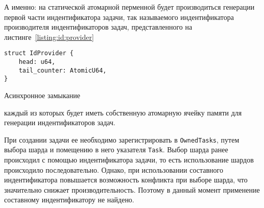 А именно: на статической атомарной перменной будет производиться генерации первой части индентификатора задачи, так называемого индентификатора производителя индентификаторов задач, представленного на листинге~\ref{listing:id:provider}

\begin{listing}[H]
    \begin{verbatim}
struct IdProvider {
    head: u64,
    tail_counter: AtomicU64,
}
    \end{verbatim}

    \caption{Асинхронное замыкание}
    \label{listing:id:provider}
\end{listing}

каждый из которых будет иметь собственную атомарную ячейку памяти для генерации индентификаторов задач.

При создании задачи ее необходимо зарегистрировать в \verb|OwnedTasks|, путем выбора шарда и помещению в него указателя \verb|Task|. Выбор шарда ранее происходил с помощью индентификатора задачи, то есть использование шардов происходило последовательно. Однако, при использовании составного индентификатора повышается возможность конфликта при выборе шарда, что значительно снижает производительность. Поэтому в данный момент применение составному индентификатору не найдено.

